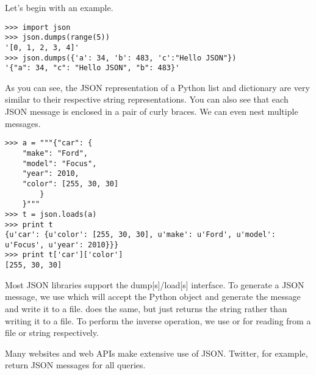 Let's begin with an example.
\begin{lstlisting}
>>> import json
>>> json.dumps(range(5))
'[0, 1, 2, 3, 4]'
>>> json.dumps({'a': 34, 'b': 483, 'c':"Hello JSON"})
'{"a": 34, "c": "Hello JSON", "b": 483}'
\end{lstlisting}
As you can see, the JSON representation of a Python list and dictionary are very similar to their respective string representations.
You can also see that each JSON message is enclosed in a pair of curly braces.
We can even nest multiple messages.
\begin{lstlisting}
>>> a = """{"car": {
    "make": "Ford",
    "model": "Focus",
    "year": 2010,
    "color": [255, 30, 30]
        }
    }"""
>>> t = json.loads(a)
>>> print t 
{u'car': {u'color': [255, 30, 30], u'make': u'Ford', u'model': u'Focus', u'year': 2010}}}
>>> print t['car']['color']
[255, 30, 30]
\end{lstlisting}

Most JSON libraries support the dump[s]/load[s] interface.
To generate a JSON message, we use  which will accept the Python object and generate the message and write it to a file.
 does the same, but just returns the string rather than writing it to a file.
To perform the inverse operation, we use  or  for reading from a file or string respectively.

Many websites and web APIs make extensive use of JSON.
Twitter, for example, return JSON messages for all queries.

